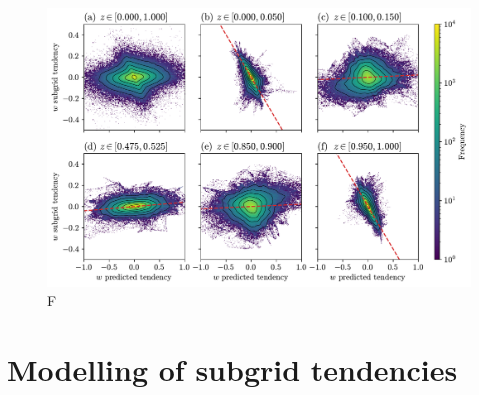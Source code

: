 \documentclass[../main.tex]{subfiles}
\begin{document}
\begin{figure}[ht]
    \centering
    \includegraphics[width=\linewidth]{figures/w_subgrid_vs_pred_tend.pdf}
    \caption{
        F
    }
    \label{fig:w_subgrid_vs_pred_tend}
\end{figure}


\section{Modelling of subgrid tendencies}


\ifSubfilesClassLoaded{%
    \emergencystretch=5em
    \printbibliography{}
}{}
\end{document}
